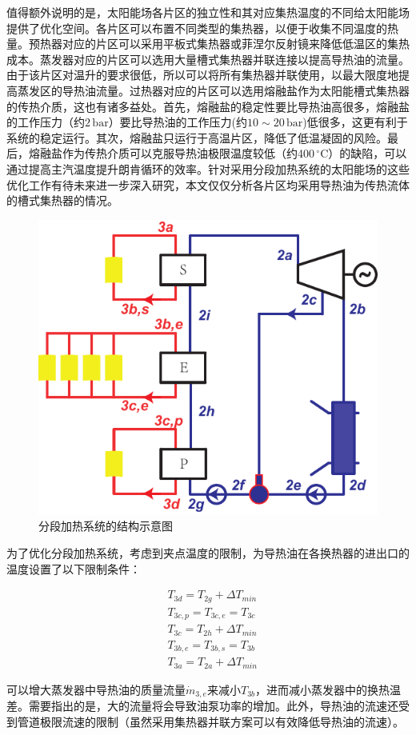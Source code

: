值得额外说明的是，太阳能场各片区的独立性和其对应集热温度的不同给太阳能场提供了优化空间。各片区可以布置不同类型的集热器，以便于收集不同温度的热量。预热器对应的片区可以采用平板式集热器或菲涅尔反射镜来降低低温区的集热成本。蒸发器对应的片区可以选用大量槽式集热器并联连接以提高导热油的流量。由于该片区对温升的要求很低，所以可以将所有集热器并联使用，以最大限度地提高蒸发区的导热油流量。过热器对应的片区可以选用熔融盐作为太阳能槽式集热器的传热介质，这也有诸多益处。首先，熔融盐的稳定性要比导热油高很多，熔融盐的工作压力（约$2\,\mathrm{bar}$）要比导热油的工作压力(约$10\sim20\,\mathrm{bar}$)低很多，这更有利于系统的稳定运行。其次，熔融盐只运行于高温片区，降低了低温凝固的风险。最后，熔融盐作为传热介质可以克服导热油极限温度较低（约400$\,^\circ\mathrm{C}$）的缺陷，可以通过提高主汽温度提升朗肯循环的效率。针对采用分段加热系统的太阳能场的这些优化工作有待未来进一步深入研究，本文仅仅分析各片区均采用导热油为传热流体的槽式集热器的情况。

\noindent \begin{figure}[htbp]
\begin{center}
	\includegraphics[width = 0.5\columnwidth]{fig/SEP}
	\caption{分段加热系统的结构示意图}
	\label{fig:SEP}
\end{center}
\end{figure}

为了优化分段加热系统，考虑到夹点温度的限制，为导热油在各换热器的进出口的温度设置了以下限制条件：

\begin{eqnarray*}
	&T_{3d} = T_{2g} + \Delta T_{min}\\
   &T_{3c,p} = T_{3c,e} = T_{3c}\\
   &T_{3c} = T_{2h} + \Delta T_{min}\\
	&T_{3b,e} = T_{3b,s} = T_{3b}\\
	&T_{3a} = T_{2a} + \Delta T_{min}
\end{eqnarray*}

可以增大蒸发器中导热油的质量流量$\dot{m}_{3,e}$来减小$T_{3b}$，进而减小蒸发器中的换热温差。需要指出的是，大的流量将会导致油泵功率的增加。此外，导热油的流速还受到管道极限流速的限制（虽然采用集热器并联方案可以有效降低导热油的流速）。

